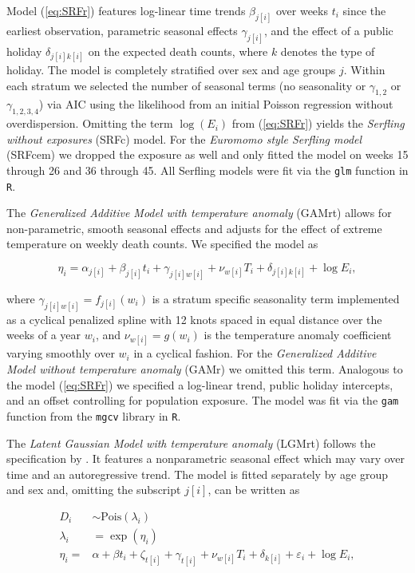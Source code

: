 \documentclass[12pt]{article}
\begin{document}
Model (\ref{eq:SRFr}) features log-linear time trends $\beta_{j[i]}$ over weeks $t_i$ since the earliest observation, parametric seasonal effects $\gamma_{j[i]}$, and the effect of a public holiday $\delta_{j[i]k[i]}$ on the expected death counts, where $k$ denotes the type of holiday. The model is completely stratified over sex and age groups $j$. Within each stratum we selected the number of seasonal terms (no seasonality or $\gamma_{1,2}$ or $\gamma_{1,2,3,4}$) via AIC using the likelihood from an initial Poisson regression without overdispersion. Omitting the term $\log(E_i)$ from (\ref{eq:SRFr}) yields the \emph{Serfling without exposures} (SRFc) model. For the \emph{Euromomo style Serfling model} (SRFcem) we dropped the exposure as well and only fitted the model on weeks 15 through 26 and 36 through 45. All Serfling models were fit via the \texttt{glm} function in \texttt{R}.

The \emph{Generalized Additive Model with temperature anomaly} (GAMrt) allows for non-parametric, smooth seasonal effects and adjusts for the effect of extreme temperature on weekly death counts. We specified the model as

\begin{equation}
  \eta_i = \alpha_{j[i]} + \beta_{j[i]}t_i + \gamma_{j[i]w[i]} + \nu_{w[i]} T_i + \delta_{j[i]k[i]} + \log E_i,
  \label{eq:GAMrt}
\end{equation}

where $\gamma_{j[i]w[i]} = f_{j[i]}(w_i)$ is a stratum specific seasonality term implemented as a cyclical penalized spline with 12 knots spaced in equal distance over the weeks of a year $w_i$, and $\nu_{w[i]}=g(w_i)$ is the temperature anomaly coefficient varying smoothly over $w_i$ in a cyclical fashion. For the \emph{Generalized Additive Model without temperature anomaly} (GAMr) we omitted this term. Analogous to the model (\ref{eq:SRFr}) we specified a log-linear trend, public holiday intercepts, and an offset controlling for population exposure. The model was fit via the \texttt{gam} function from the \texttt{mgcv} library in \texttt{R}.

The \emph{Latent Gaussian Model with temperature anomaly} (LGMrt) follows the specification by \cite{Kontis2020}. It features a nonparametric seasonal effect which may vary over time and an autoregressive trend. The model is fitted separately by age group and sex and, omitting the subscript $j[i]$, can be written as

\begin{equation}
  \begin{aligned}
    D_i &\sim \text{Pois}(\lambda_i) \\
    \lambda_i &= \exp(\eta_i) \\
    \eta_i =& \alpha + \beta t_i +
    \zeta_{t[i]} + \gamma_{t[i]} +
    \nu_{w[i]} T_i + \delta_{k[i]} + \varepsilon_i + \log E_i,
  \end{aligned}
  \label{eq:LGMrt}
\end{equation}
\end{document}
